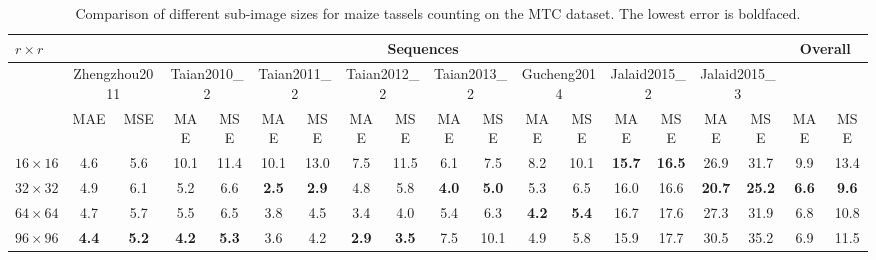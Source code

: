 \documentclass[twocolumn]{bmcart}%
\begin{document}
\begin{table*}[!t] \footnotesize
	\centering
	\caption{Comparison of different sub-image sizes for maize tassels counting on the MTC dataset. The lowest error is boldfaced.}
	\label{tab:subim_sizes}
	\renewcommand\arraystretch{1.25}
	\addtolength{\tabcolsep}{-3.5pt}
	\begin{tabular}{l|cc|cc|cc|cc|cc|cc|cc|cc|cc}
		\hline
		$r\times r$                & \multicolumn{16}{c|}{Sequences} & \multicolumn{2}{c}{Overall}\\
		\hline
		& \multicolumn{2}{c|}{\scriptsize Zhengzhou2011}  & \multicolumn{2}{c|}{\scriptsize Taian2010\_2} & \multicolumn{2}{c|}{\scriptsize Taian2011\_2} & \multicolumn{2}{c|}{ \scriptsize Taian2012\_2} & \multicolumn{2}{c|}{\scriptsize Taian2013\_2} & \multicolumn{2}{c|}{\scriptsize Gucheng2014} & \multicolumn{2}{c|}{\scriptsize Jalaid2015\_2} & \multicolumn{2}{c|}{\scriptsize Jalaid2015\_3} & \\
		& MAE  & MSE  & MAE  & MSE  & MAE  & MSE  & MAE  & MSE  & MAE  & MSE  & MAE  & MSE  & MAE  & MSE  & MAE  & MSE  & MAE  & MSE \\
		$16\times 16$ & 4.6 & 5.6 & 10.1 & 11.4 & 10.1 & 13.0 & 7.5 & 11.5 & 6.1 & 7.5 & 8.2 & 10.1 & \textbf{15.7} & \textbf{16.5} & 26.9 & 31.7 & 9.9 & 13.4\\

		$32\times 32$ & 4.9 & 6.1 & 5.2 & 6.6 & \textbf{2.5} & \textbf{2.9} & 4.8 & 5.8 & \textbf{4.0} & \textbf{5.0} & 5.3 & 6.5 & 16.0 & 16.6 & \textbf{20.7} & \textbf{25.2} & \textbf{6.6} & \textbf{9.6}\\
		$64\times 64$ & 4.7 & 5.7 & 5.5 & 6.5 & 3.8 & 4.5 & 3.4 & 4.0 & 5.4 & 6.3 & \textbf{4.2} & \textbf{5.4} & 16.7 & 17.6 & 27.3 & 31.9 & 6.8 & 10.8\\

		$96\times 96$ & \textbf{4.4} & \textbf{5.2} & \textbf{4.2} & \textbf{5.3} & 3.6 & 4.2 & \textbf{2.9} & \textbf{3.5} & 7.5 & 10.1 & 4.9 & 5.8 & 15.9 & 17.7 & 30.5 & 35.2 & 6.9 & 11.5\\

		\hline
	\end{tabular}
\end{table*}
\end{document}
